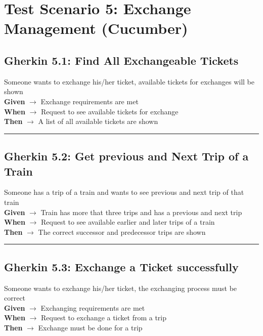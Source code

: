 \documentclass{article}
\begin{document}
\pagebreak

\section{Test Scenario 5: Exchange Management (Cucumber)}
\bigskip
\bigskip
\subsection{Gherkin 5.1: Find All Exchangeable Tickets}

Someone wants to exchange his/her ticket, available tickets for exchanges will be shown\\
\textbf{Given} $\rightarrow$ Exchange requirements are met \\
\textbf{When} $\rightarrow$ Request to see available tickets for exchange \\
\textbf{Then} $\rightarrow$ A list of all available tickets are shown

\bigskip
\hrule
\bigskip

\subsection{Gherkin 5.2: Get previous and Next Trip of a Train}

Someone has a trip of a train and wants to see previous and next trip of that train\\
\textbf{Given} $\rightarrow$ Train has more that three trips and has a previous and next trip \\
\textbf{When} $\rightarrow$ Request to see available earlier and later trips of a train \\
\textbf{Then} $\rightarrow$ The correct successor and predecessor trips are shown

\bigskip
\hrule
\bigskip

\subsection{Gherkin 5.3: Exchange a Ticket successfully}

Someone wants to exchange his/her ticket, the exchanging process must be correct\\
\textbf{Given} $\rightarrow$ Exchanging requirements are met \\
\textbf{When} $\rightarrow$ Request to exchange a ticket from a trip \\
\textbf{Then} $\rightarrow$ Exchange must be done for a trip
\end{document}
